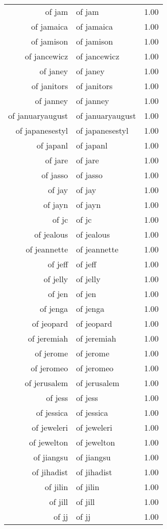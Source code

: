 \begin{table}[ht]
\begin{tabular}{rlr}
  of jam & of jam & 1.00 \\ 
  of jamaica & of jamaica & 1.00 \\ 
  of jamison & of jamison & 1.00 \\ 
  of jancewicz & of jancewicz & 1.00 \\ 
  of janey & of janey & 1.00 \\ 
  of janitors & of janitors & 1.00 \\ 
  of janney & of janney & 1.00 \\ 
  of januaryaugust & of januaryaugust & 1.00 \\ 
  of japanesestyl & of japanesestyl & 1.00 \\ 
  of japanl & of japanl & 1.00 \\ 
  of jare & of jare & 1.00 \\ 
  of jasso & of jasso & 1.00 \\ 
  of jay & of jay & 1.00 \\ 
  of jayn & of jayn & 1.00 \\ 
  of jc & of jc & 1.00 \\ 
  of jealous & of jealous & 1.00 \\ 
  of jeannette & of jeannette & 1.00 \\ 
  of jeff & of jeff & 1.00 \\ 
  of jelly & of jelly & 1.00 \\ 
  of jen & of jen & 1.00 \\ 
  of jenga & of jenga & 1.00 \\ 
  of jeopard & of jeopard & 1.00 \\ 
  of jeremiah & of jeremiah & 1.00 \\ 
  of jerome & of jerome & 1.00 \\ 
  of jeromeo & of jeromeo & 1.00 \\ 
  of jerusalem & of jerusalem & 1.00 \\ 
  of jess & of jess & 1.00 \\ 
  of jessica & of jessica & 1.00 \\ 
  of jeweleri & of jeweleri & 1.00 \\ 
  of jewelton & of jewelton & 1.00 \\ 
  of jiangsu & of jiangsu & 1.00 \\ 
  of jihadist & of jihadist & 1.00 \\ 
  of jilin & of jilin & 1.00 \\ 
  of jill & of jill & 1.00 \\ 
  of jj & of jj & 1.00 \\ 

\end{tabular}
\end{table}

